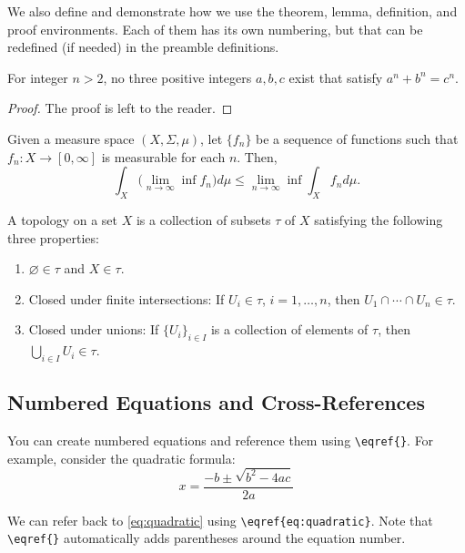 
We also define and demonstrate how we use the theorem, lemma, definition, and proof environments. Each of them has its own numbering, but that can be redefined (if needed) in the preamble definitions. 


\begin{theorem}
For integer $n > 2$, no three positive integers $a, b, c$ exist that satisfy $a^n + b^n = c^n$.
\end{theorem}

\begin{proof}
The proof is left to the reader.
\end{proof}

\begin{lemma} Given a measure space $(X, \Sigma, \mu)$, let $\{f_n\}$ be a sequence of functions such that $f_n: X \to [0, \infty]$ is measurable for each $n$. Then,
$$
\int_X \bigg(\lim_{n \to \infty} \inf f_n\bigg ) d\mu  \leq \lim_{n \to \infty} \inf \int_X f_n d\mu. 
$$
\end{lemma}

\begin{definition}[Topology]
A topology on a set $X$ is a collection of subsets $\tau$ of $X$ satisfying the following three properties:
\begin{enumerate}
\item $\varnothing \in \tau$ and $X \in \tau$.
\item Closed under finite intersections: If $U_i \in \tau$, $i=1, \ldots, n$, then $U_1 \cap \cdots \cap U_n \in \tau$.
\item Closed under unions: If $\{U_i\}_{i \in I}$ is a collection of elements of $\tau$, then $\bigcup_{i \in I} U_i \in \tau$.
\end{enumerate}
\end{definition}

\subsection{Numbered Equations and Cross-References}

You can create numbered equations and reference them using \verb|\eqref{}|. For example, consider the quadratic formula:
\begin{equation}
\label{eq:quadratic}
x = \frac{-b \pm \sqrt{b^2 - 4ac}}{2a}
\end{equation}

We can refer back to \eqref{eq:quadratic} using \verb|\eqref{eq:quadratic}|. Note that \verb|\eqref{}| automatically adds parentheses around the equation number.

